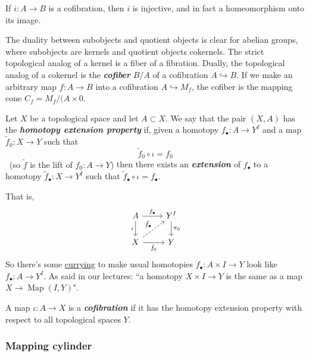 \begin{prop}[4H.1]
	If $i:A\to B$ is a cofibration, then $i$ is injective, and in fact a homeomorphism onto its image.
\end{prop}

\begin{remark}
	The duality between subobjects and quotient objects is clear for abelian groups, where subobjects are kernels and quotient objects cokernels. The strict topological analog of a kernel is a fiber of a fibration. Dually, the topological analog of a cokernel is the \textit{\textbf{cofiber}} $B/A$ of a cofibration $A\hookrightarrow B$. If we make an arbitrary map  $f:A\to B$ into a cofibration $A\hookrightarrow M_{f}$, the cofiber is the mapping cone $C_{f}=M_{f}/(A\times {0}$.
\end{remark}

\begin{defn}
	Let $X$ be a topological space and let $A\subset X$. We say that the pair $(X,A)$ has the \textbf{\textit{homotopy extension property}} if, given a homotopy $f_\bullet:A\to Y^I$ and a map $\tilde{f}_0:X\to Y$ such that
		\[\tilde{f}_0\circ\iota=f_0\]\
		{\color{cyan}(so $\tilde{f}$ is the lift of $f_0:A\to Y$)} then there exists an \textbf{\textit{extension}} of $f_\bullet$ to a homotopy $\tilde{f}_\bullet:X\to Y^I$ such that $\tilde{f}_\bullet\circ\iota=f_\bullet$.
		
		That is,
		\[\begin{tikzcd}
			A\arrow[r,"f_\bullet"]\arrow[d,swap,"\iota"]&Y^I\arrow[d,"\pi_0"]\\
			X\arrow[ur,dashed,"\tilde{f}_\bullet"]\arrow[r,swap,"\tilde{f}_0"]&Y
		\end{tikzcd}\]
		{\color{persimmon}So there's some \href{https://en.wikipedia.org/wiki/Currying#Function_spaces}{currying} to make usual homotopies $f_\bullet:A\times I\to Y$ look like $f_\bullet:A\to Y^I$. As said in our lectures: ``a homotopy $X\times I\to Y$ is the same as a map $X\to \operatorname{Map}(I,Y)$".}

	A map $\iota:A\to X$ is a \textit{\textbf{cofibration}} if it has the homotopy extension property with respect to all topological spaces  $Y$.
\end{defn}

\subsubsection{Mapping cylinder}

